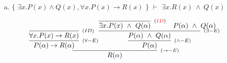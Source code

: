 \documentclass[aspectratio=43]{beamer}
\begin{document}
    \begin{frame}[fragile]
    
    	\begin{enumerate}[d)]
			\item $\{$ $\exists x.P(x)\land Q(x), \forall x.P(x)\to R(x)$ $\}$ $\vdash$ $\exists x.R(x)\ \land\ Q(x) $\\
		\end{enumerate}
        
        \vspace{65pt}
        
        \[
        \begin{array}{c}
		
        	\infer[_{(\to -E)}]
            	{R(\alpha)}
            	{\infer[_{(\forall -E)}]
                	{P(\alpha) \rightarrow R(\alpha)} 
                    {\infer[_{(ID)}]
                    	{\forall x.P(x)\to R(x)}
                    	{}
                    }  
            	\infer[_{(\land -E)}] 
                	{P(\alpha)}
                    {\infer[_{(\exists -E)}]
                    	{P(\alpha)\ \land \ Q(\alpha)}
                    	{\infer[_{(\textcolor{red}{ID})}]
                        	{\exists x.P(x)\ \land \ Q(\alpha)}
                            {}
                        \hspace{10pt}
                        P(\alpha)\ \land \ Q(\alpha)
                        }
                    }
                }
		\end{array}
        \]
        
	\end{frame}
    
\end{document}

